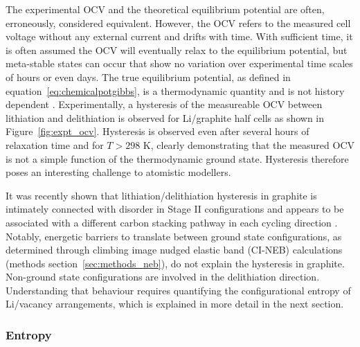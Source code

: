 \documentclass[../main.tex]{subfiles}
\begin{document}
The experimental OCV and the theoretical equilibrium potential are often, erroneously, considered equivalent. However, the OCV refers to the measured cell voltage without any external current and drifts with time. With sufficient time, it is often assumed the OCV will eventually relax to the equilibrium potential, but meta-stable states can occur that show no variation over experimental time scales of hours or even days.\cite{Liu2014,orisaka2013,Mercer2021} The true equilibrium potential, as defined in equation~\ref{eq:chemicalpotgibbs}, is a thermodynamic quantity and is not history dependent \cite{VanderVen2020,Mercer2021}. Experimentally, a hysteresis of the measureable OCV between lithiation and delithiation is observed for Li/graphite half cells \cite{Ohzuku1993,Zheng1995,Dahn1991,Allart2018,Gallagher2012,Yazami_2006,GRIMSMANN201817,didier2020,Mercer2021} as shown in Figure~\ref{fig:expt_ocv}. Hysteresis is observed even after several hours of relaxation time and for $T>298$ K, clearly demonstrating that the measured OCV is not a simple function of the thermodynamic ground state. Hysteresis therefore poses an interesting challenge to atomistic modellers.

It was recently shown that lithiation/delithiation hysteresis in graphite is intimately connected with disorder in Stage II configurations and appears to be associated with a different carbon stacking pathway in each cycling direction \cite{Mercer2021}. Notably, energetic barriers to translate between ground state configurations, as determined through climbing image nudged elastic band (CI-NEB) calculations (methods section~\ref{sec:methods_neb}), do not explain the hysteresis in graphite. Non-ground state configurations are involved in the delithiation direction. Understanding that behaviour requires quantifying the configurational entropy of Li/vacancy arrangements, which is explained in more detail in the next section.  

\subsubsection{Entropy}
\label{sec:anodes_entropy}
\end{document}
